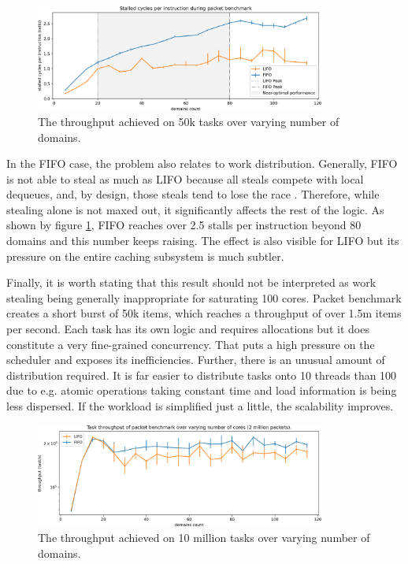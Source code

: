 \documentclass[12pt,a4paper,twoside]{report}
\begin{document}

\begin{figure} 
     \centering 
     \includegraphics[width=0.85\textwidth]{eval/packet-basic-counters.png}
     \caption{The throughput achieved on 50k tasks over varying number of domains.}
    \label{fig:packet-counters}
\end{figure}

In the FIFO case, the problem also relates to work distribution. Generally, FIFO is not able to steal as much as LIFO because all steals compete with local dequeues, and, by design, those steals tend to lose the race . Therefore, while stealing alone is not maxed out, it significantly affects the rest of the logic. As shown by figure \ref{fig:packet-counters}, FIFO reaches over 2.5 stalls per instruction beyond 80 domains and this number keeps raising. The effect is also visible for LIFO but its pressure on the entire caching subsystem is much subtler.


Finally, it is worth stating that this result should not be interpreted as work stealing being generally inappropriate for saturating 100 cores. Packet benchmark creates a short burst of 50k items, which reaches a throughput of over 1.5m items per second. Each task has its own logic and requires allocations but it does constitute a very fine-grained concurrency. That puts a high pressure on the scheduler and exposes its inefficiencies. Further, there is an unusual amount of distribution required. It is far easier to distribute tasks onto 10 threads than 100 due to e.g. atomic operations taking constant time and load information is being less dispersed. If the workload is simplified just a little, the scalability improves. 

\begin{figure} 
     \centering
     \includegraphics[width=0.85\textwidth]{eval/packet-basic-10million-just-throughput.png}
     \caption{The throughput achieved on 10 million tasks over varying number of domains.}
    \label{fig:packet-10m-throughput}
\end{figure}
\end{document}
